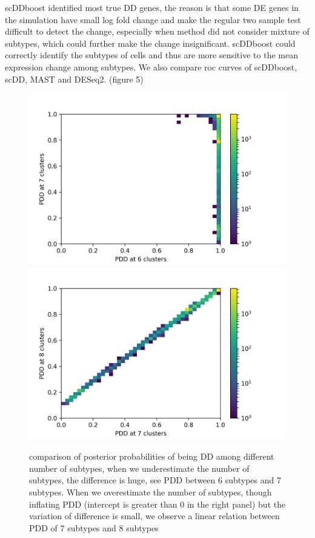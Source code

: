 \documentclass[11pt]{amsart}
\begin{document}
scDDboost identified most true DD genes, the reason is that some DE genes in the simulation have small log fold change and make the regular two sample test difficult to detect the change, especially when method did not consider mixture of subtypes, which could further make the change insignificant. scDDboost could correctly identify the subtypes of cells and thus are more sensitive to the mean expression change among subtypes. We also compare roc curves of scDDboost, scDD, MAST and DESeq2. (figure 5)
\begin{figure}[h]
  \includegraphics[width=\textwidth]{sim_67.png}
\endminipage\hfill
{}
  \includegraphics[width=\textwidth]{sim_78.png}
  \endminipage
\caption{comparison of posterior probabilities of being DD among different number of subtypes, when we underestimate the number of subtypes, the difference is huge, see PDD between 6 subtypes and 7 subtypes. When we overestimate the number of subtypes, though inflating PDD (intercept is greater than 0 in the right panel) but the variation of difference is small, we observe a linear relation between PDD of 7 subtypes and 8 subtypes}
\end{figure}
\end{document}
